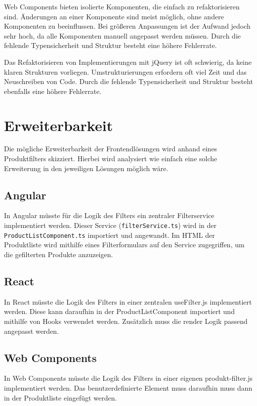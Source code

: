 \documentclass[oneside]{ausarbeitung}
\begin{document}
Web Components bieten isolierte Komponenten, die einfach zu refaktorisieren sind. Änderungen an einer Komponente sind meist möglich, ohne andere Komponenten zu beeinflussen. Bei größeren Anpassungen ist der Aufwand jedoch sehr hoch, da alle Komponenten manuell angepasst werden müssen. Durch die fehlende Typensicherheit und Struktur besteht eine höhere Fehlerrate.

Das Refaktorisieren von Implementierungen mit jQuery ist oft schwierig, da keine klaren Strukturen vorliegen. Umstrukturierungen erfordern oft viel Zeit und das Neuschreiben von Code. Durch die fehlende Typensicherheit und Struktur besteht ebenfalls eine höhere Fehlerrate.

\section{Erweiterbarkeit}

Die mögliche Erweiterbarkeit der Frontendlösungen wird anhand eines Produktfilters skizziert. Hierbei wird analysiert wie einfach eine solche Erweiterung in den jeweiligen Lösungen möglich wäre. 

\subsection{Angular}

In Angular müsste für die Logik des Filters ein zentraler Filterservice implementiert werden. Dieser Service (\texttt{filterService.ts}) wird in der \texttt{ProductListComponent.ts} importiert und angewandt. Im \ac{HTML} der Produktliste wird mithilfe eines Filterformulars auf den Service zugegriffen, um die gefilterten Produkte anzuzeigen.

\subsection{React}

In React müsste die Logik des Filters in einer zentralen useFilter.js implementiert werden. Diese kann daraufhin in der ProductListComponent importiert und mithilfe von Hooks verwendet werden. Zusätzlich muss die render Logik passend angepasst werden. 

\subsection{Web Components}

In Web Components müsste die Logik des Filters in einer eigenen produkt-filter.js implementiert werden. Das benutzerdefinierte Element muss daraufhin muss dann in der Produktliste eingefügt werden. 
\end{document}
